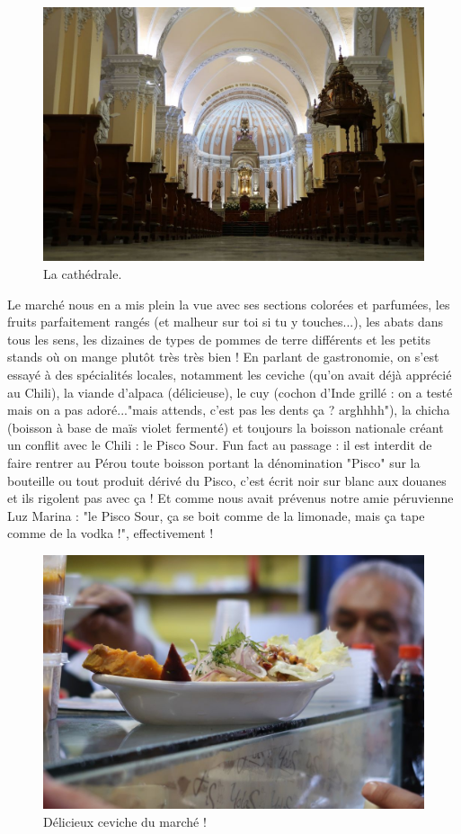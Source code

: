 \begin{figure}
\centering
\includegraphics{images/20180911_cathedrale.JPG}
\caption{La cathédrale.}
\end{figure}

Le marché nous en a mis plein la vue avec ses sections colorées et
parfumées, les fruits parfaitement rangés (et malheur sur toi si tu y
touches...), les abats dans tous les sens, les dizaines de types de
pommes de terre différents et les petits stands où on mange plutôt très
très bien ! En parlant de gastronomie, on s'est essayé à des spécialités
locales, notamment les ceviche (qu'on avait déjà apprécié au Chili), la
viande d'alpaca (délicieuse), le cuy (cochon d'Inde grillé : on a testé
mais on a pas adoré..."mais attends, c'est pas les dents ça ? arghhhh"),
la chicha (boisson à base de maïs violet fermenté) et toujours la
boisson nationale créant un conflit avec le Chili : le Pisco Sour. Fun
fact au passage : il est interdit de faire rentrer au Pérou toute
boisson portant la dénomination "Pisco" sur la bouteille ou tout produit
dérivé du Pisco, c'est écrit noir sur blanc aux douanes et ils rigolent
pas avec ça ! Et comme nous avait prévenus notre amie péruvienne Luz
Marina : "le Pisco Sour, ça se boit comme de la limonade, mais ça tape
comme de la vodka !", effectivement !

\begin{figure}
\centering
\includegraphics{images/20180911_ceviche.JPG}
\caption{Délicieux ceviche du marché !}
\end{figure}

